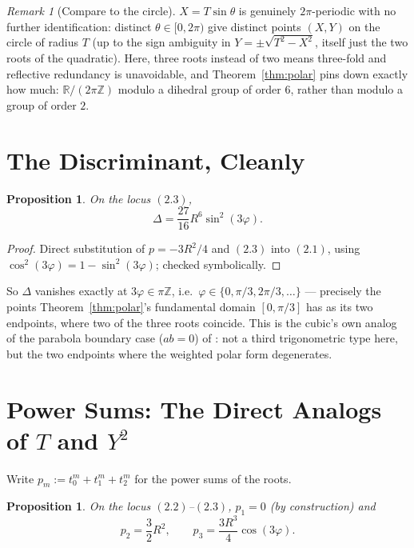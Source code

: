 \documentclass[11pt]{amsart}
\newtheorem{proposition}[theorem]{Proposition}
\theoremstyle{remark}
\newtheorem*{remark}{Remark}
\begin{document}
\begin{remark}[Compare to the circle]
$X=T\sin\theta$ is genuinely $2\pi$-periodic with no further identification: distinct $\theta\in[0,2\pi)$ give distinct points $(X,Y)$ on the circle of radius $T$ (up to the sign ambiguity in $Y=\pm\sqrt{T^2-X^2}$, itself just the two roots of the quadratic). Here, three roots instead of two means three-fold and reflective redundancy is unavoidable, and Theorem~\ref{thm:polar} pins down exactly how much: $\mathbb R/(2\pi\mathbb Z)$ modulo a dihedral group of order $6$, rather than modulo a group of order $2$.
\end{remark}

\section{The Discriminant, Cleanly}

\begin{proposition}\label{prop:discriminant}
On the locus $(2.3)$,
\begin{equation}
\Delta=\frac{27}{16}R^6\sin^2(3\varphi). \tag{3.1}
\end{equation}
\end{proposition}

\begin{proof}
Direct substitution of $p=-3R^2/4$ and $(2.3)$ into $(2.1)$, using $\cos^2(3\varphi)=1-\sin^2(3\varphi)$; checked symbolically.
\end{proof}

So $\Delta$ vanishes exactly at $3\varphi\in\pi\mathbb Z$, i.e.\ $\varphi\in\{0,\pi/3,2\pi/3,\dots\}$ --- precisely the points Theorem~\ref{thm:polar}'s fundamental domain $[0,\pi/3]$ has as its two endpoints, where two of the three roots coincide. This is the cubic's own analog of the parabola boundary case ($ab=0$) of \cite{Ebert2026EigenCoord}: not a third trigonometric type here, but the two endpoints where the weighted polar form degenerates.

\section{Power Sums: The Direct Analogs of $T$ and $Y^2$}

Write $p_m:=t_0^m+t_1^m+t_2^m$ for the power sums of the roots.

\begin{proposition}\label{prop:powersums}
On the locus $(2.2)$--$(2.3)$, $p_1=0$ (by construction) and
\begin{equation}
p_2=\frac32R^2,\qquad p_3=\frac{3R^3}4\cos(3\varphi). \tag{4.1}
\end{equation}
\end{proposition}
\end{document}
